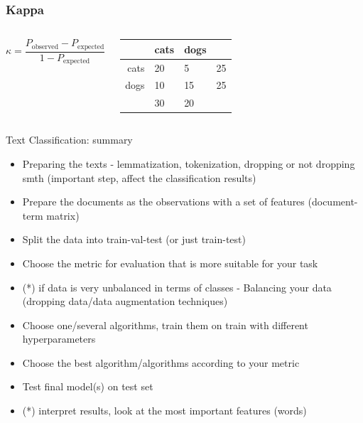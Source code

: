 \documentclass[svgnames]{beamer}
\begin{document}
\begin{frame}
  \frametitle{Kappa}
  \begin{columns}
    \begin{equation}
      \kappa = \frac{P_{\mathrm{observed}}-P_{\mathrm{expected}}}{1-P_{\mathrm{expected}}}
    \end{equation}
    \begin{tabular}{r|ll|r}
     & cats  & dogs \\
      \hline
    cats & 20 & 5 & \alert{25}\\
    dogs & 10 & 15 & \alert{25} \\
    \hline
    & \alert{30} & \alert{20} & 
    \end{tabular}
  \end{columns}
\end{frame}


\begin{frame}{Text Classification: summary}
  \begin{itemize}
    \item Preparing the texts - lemmatization, tokenization, dropping or not dropping smth (important step, affect the classification results)
    \item Prepare the documents as the observations with a set of features (document-term matrix)
    \item Split the data into train-val-test (or just train-test)
    \item Choose the metric for evaluation that is more suitable for your task
    \item (*) if data is very unbalanced in terms of classes - Balancing your data (dropping data/data augmentation techniques)
    \item Choose one/several algorithms, train them on train with different hyperparameters
    \item Choose the best algorithm/algorithms according to your metric
    \item Test final model(s) on test set
    \item (*) interpret results, look at the most important features (words)
  \end{itemize}
\end{frame}
\end{document}
